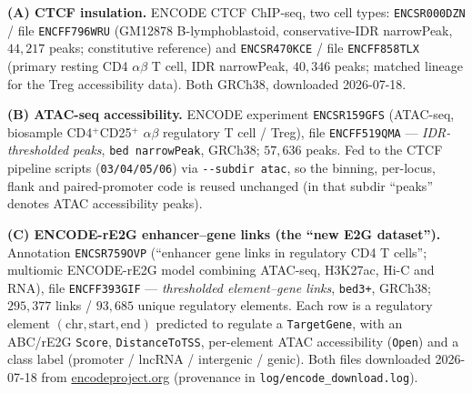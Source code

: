 \documentclass[11pt]{article}
\begin{document}
\textbf{(A) CTCF insulation.} ENCODE CTCF ChIP-seq, two cell types: \texttt{ENCSR000DZN} / file
\texttt{ENCFF796WRU} (GM12878 B-lymphoblastoid, conservative-IDR narrowPeak, $44{,}217$ peaks;
constitutive reference) and \texttt{ENCSR470KCE} / file \texttt{ENCFF858TLX} (primary resting CD4
$\alpha\beta$ T cell, IDR narrowPeak, $40{,}346$ peaks; matched lineage for the Treg accessibility
data). Both GRCh38, downloaded 2026-07-18.

\textbf{(B) ATAC-seq accessibility.} ENCODE experiment \texttt{ENCSR159GFS} (ATAC-seq, biosample
CD4$^+$CD25$^+$ $\alpha\beta$ regulatory T cell / Treg), file \texttt{ENCFF519QMA} ---
\emph{IDR-thresholded peaks}, \texttt{bed narrowPeak}, GRCh38; $57{,}636$ peaks. Fed to the CTCF
pipeline scripts (\texttt{03/04/05/06}) via \texttt{-{}-subdir atac}, so the binning, per-locus,
flank and paired-promoter code is reused unchanged (in that subdir ``peaks'' denotes ATAC
accessibility peaks).

\textbf{(C) ENCODE-rE2G enhancer--gene links (the ``new E2G dataset'').} Annotation
\texttt{ENCSR759OVP} (``enhancer gene links in regulatory CD4 T cells''; multiomic ENCODE-rE2G
model combining ATAC-seq, H3K27ac, Hi-C and RNA), file \texttt{ENCFF393GIF} --- \emph{thresholded
element--gene links}, \texttt{bed3+}, GRCh38; $295{,}377$ links / $93{,}685$ unique regulatory
elements. Each row is a regulatory element $(\mathrm{chr},\mathrm{start},\mathrm{end})$ predicted to
regulate a \texttt{TargetGene}, with an ABC/rE2G \texttt{Score}, \texttt{DistanceToTSS}, per-element
ATAC accessibility (\texttt{Open}) and a class label (promoter / lncRNA / intergenic / genic).
Both files downloaded 2026-07-18 from \href{https://www.encodeproject.org}{encodeproject.org}
(provenance in \texttt{log/encode\_download.log}).
\end{document}
